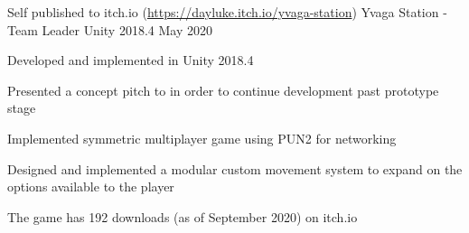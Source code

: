 

\begin{cventries}

    \cventry
    {Self published to itch.io (\href{https://dayluke.itch.io/yvaga-station}{https://dayluke.itch.io/yvaga-station})}
    {Yvaga Station - Team Leader}
    {Unity 2018.4}
    {May 2020}
    {
        \begin{cvitems}
            \item Developed and implemented in Unity 2018.4
            \item Presented a concept pitch to in order to continue development past prototype stage
            \item Implemented symmetric multiplayer game using PUN2 for networking
            \item Designed and implemented a modular custom movement system to expand on the options available to the player
            \item The game has 192 downloads (as of September 2020) on itch.io
        \end{cvitems}
    }
\end{cventries}
